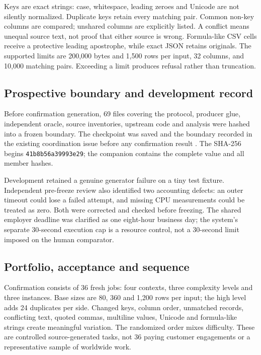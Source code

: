 \documentclass[11pt,a4paper]{article}
\newcommand{\code}[1]{\texttt{\small #1}}
\begin{document}
Keys are exact strings: case, whitespace, leading zeroes and Unicode are not silently normalized. Duplicate keys retain every matching pair. Common non-key columns are compared; unshared columns are explicitly listed. A conflict means unequal source text, not proof that either source is wrong. Formula-like CSV cells receive a protective leading apostrophe, while exact JSON retains originals. The supported limits are 200,000 bytes and 1,500 rows per input, 32 columns, and 10,000 matching pairs. Exceeding a limit produces refusal rather than truncation.

\subsection{Prospective boundary and development record}

Before confirmation generation, 69 files covering the protocol, producer glue, independent oracle, source inventories, upstream code and analysis were hashed into a frozen boundary. The checkpoint was saved and the boundary recorded in the existing coordination issue before any confirmation result \citep{study_freeze}. The SHA-256 begins \code{41b8b56a39993e29}; the companion contains the complete value and all member hashes.

Development retained a genuine generator failure on a tiny test fixture. Independent pre-freeze review also identified two accounting defects: an outer timeout could lose a failed attempt, and missing CPU measurements could be treated as zero. Both were corrected and checked before freezing. The shared employer deadline was clarified as one eight-hour business day; the system's separate 30-second execution cap is a resource control, not a 30-second limit imposed on the human comparator.

\subsection{Portfolio, acceptance and sequence}

Confirmation consists of 36 fresh jobs: four contexts, three complexity levels and three instances. Base sizes are 80, 360 and 1,200 rows per input; the high level adds 24 duplicates per side. Changed keys, column order, unmatched records, conflicting text, quoted commas, multiline values, Unicode and formula-like strings create meaningful variation. The randomized order mixes difficulty. These are controlled source-generated tasks, not 36 paying customer engagements or a representative sample of worldwide work.
\end{document}
